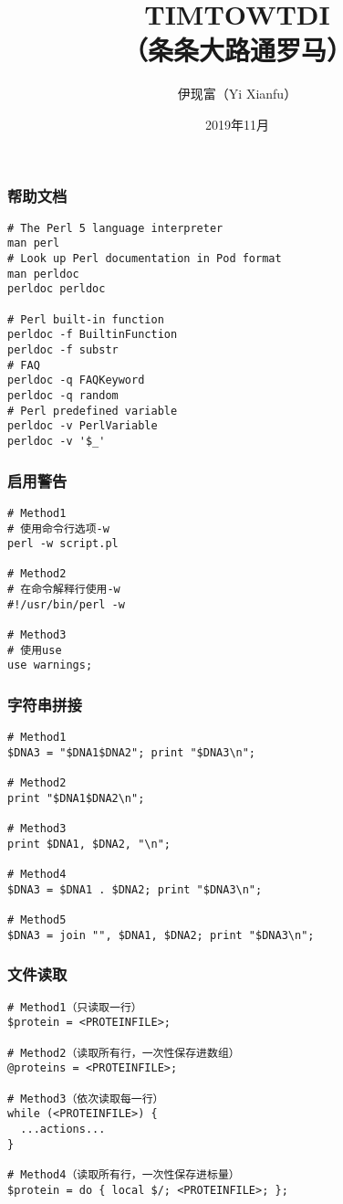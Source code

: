 


\title[TIMTOWTDI]{TIMTOWTDI\\（条条大路通罗马）}
\author[Yixf]{伊现富（Yi Xianfu）}
\date{2019年11月}

%
\begin{frame}
  \titlepage
\end{frame}

\begin{frame}[fragile]
  \frametitle{帮助文档}
\begin{lstlisting}
# The Perl 5 language interpreter
man perl
# Look up Perl documentation in Pod format
man perldoc
perldoc perldoc

# Perl built-in function
perldoc -f BuiltinFunction
perldoc -f substr
# FAQ
perldoc -q FAQKeyword
perldoc -q random
# Perl predefined variable
perldoc -v PerlVariable
perldoc -v '$_'
\end{lstlisting}
\end{frame}

\begin{frame}[fragile]
  \frametitle{启用警告}
\begin{lstlisting}
# Method1
# 使用命令行选项-w
perl -w script.pl

# Method2
# 在命令解释行使用-w
#!/usr/bin/perl -w

# Method3
# 使用use
use warnings;
\end{lstlisting}
\end{frame}

\begin{frame}[fragile]
  \frametitle{字符串拼接}
\begin{lstlisting}
# Method1
$DNA3 = "$DNA1$DNA2"; print "$DNA3\n";

# Method2
print "$DNA1$DNA2\n";

# Method3
print $DNA1, $DNA2, "\n";

# Method4
$DNA3 = $DNA1 . $DNA2; print "$DNA3\n";

# Method5
$DNA3 = join "", $DNA1, $DNA2; print "$DNA3\n";
\end{lstlisting}
\end{frame}

\begin{frame}[fragile]
  \frametitle{文件读取}
\begin{lstlisting}
# Method1（只读取一行）
$protein = <PROTEINFILE>;

# Method2（读取所有行，一次性保存进数组）
@proteins = <PROTEINFILE>;

# Method3（依次读取每一行）
while (<PROTEINFILE>) {
  ...actions...
}

# Method4（读取所有行，一次性保存进标量）
$protein = do { local $/; <PROTEINFILE>; };
\end{lstlisting}
\end{frame}

